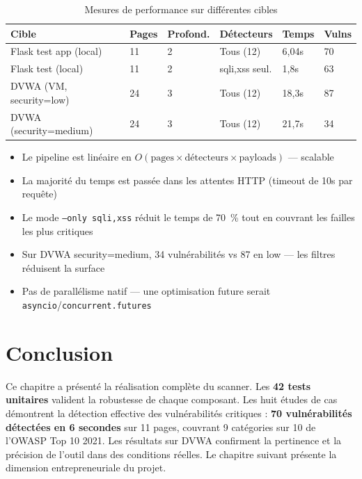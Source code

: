 \documentclass[12pt,a4paper]{report}
\newcommand{\code}[1]{\texttt{#1}}
\newcommand{\hdr}[1]{\cellcolor{gray!15}\textbf{#1}}
\newcommand{\rowA}{\rowcolor{gray!8}}
\begin{document}
\begin{table}[h!]
\centering
\caption{Mesures de performance sur différentes cibles}
\begin{tabular}{p{4cm}p{1.2cm}p{1.5cm}p{2.5cm}p{1.5cm}p{1.2cm}}
\toprule
\hdr{Cible} & \hdr{Pages} & \hdr{Profond.} & \hdr{Détecteurs} & \hdr{Temps} & \hdr{Vulns} \\
\midrule
Flask test app (local)  & 11 & 2 & Tous (12)     & 6,04s  & 70 \\
\rowA Flask test (local)& 11 & 2 & sqli,xss seul.& 1,8s   & 63 \\
DVWA (VM, security=low) & 24 & 3 & Tous (12)     & 18,3s  & 87 \\
\rowA DVWA (security=medium) & 24 & 3 & Tous (12) & 21,7s  & 34 \\
\bottomrule
\end{tabular}
\end{table}

\begin{infobox}[title={Analyse des résultats de performance}]
\begin{itemize}[nosep]
  \item Le pipeline est linéaire en $O(\text{pages} \times \text{détecteurs} \times \text{payloads})$ — scalable
  \item La majorité du temps est passée dans les attentes HTTP (timeout de 10s par requête)
  \item Le mode \code{--only sqli,xss} réduit le temps de 70~\% tout en couvrant les failles les plus critiques
  \item Sur DVWA security=medium, 34 vulnérabilités vs 87 en low — les filtres réduisent la surface
  \item Pas de parallélisme natif — une optimisation future serait \code{asyncio}/\code{concurrent.futures}
\end{itemize}
\end{infobox}

\section{Conclusion}

Ce chapitre a présenté la réalisation complète du scanner. Les \textbf{42 tests unitaires}
valident la robustesse de chaque composant. Les huit études de cas démontrent la détection
effective des vulnérabilités critiques : \textbf{70 vulnérabilités détectées en 6 secondes}
sur 11 pages, couvrant 9 catégories sur 10 de l'OWASP Top 10 2021. Les résultats sur DVWA
confirment la pertinence et la précision de l'outil dans des conditions réelles. Le chapitre
suivant présente la dimension entrepreneuriale du projet.
\end{document}
